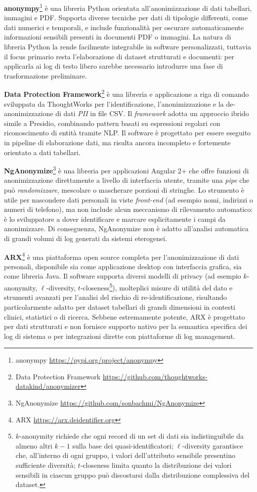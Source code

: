 \documentclass[12pt,twoside]{report}
\begin{document}
\textbf{anonympy}\footnote{anonympy \url{https://pypi.org/project/anonympy}} è una libreria Python orientata all'anonimizzazione di dati tabellari, immagini e PDF. Supporta diverse tecniche per dati di tipologie differenti, come dati numerici e temporali, e include funzionalità per oscurare automaticamente informazioni sensibili presenti in documenti PDF o immagini. La natura di libreria Python la rende facilmente integrabile in software personalizzati, tuttavia il focus primario resta l'elaborazione di dataset strutturati e documenti: per applicarla ai log di testo libero sarebbe necessario introdurre una fase di trasformazione preliminare.

\textbf{Data Protection Framework}\footnote{Data Protection Framework \url{https://github.com/thoughtworks-datakind/anonymizer}} è una libreria e applicazione a riga di comando sviluppata da ThoughtWorks per l'identificazione, l'anonimizzazione e la de-anonimizzazione di dati \textit{PII} in file CSV. Il \textit{framework} adotta un approccio ibrido simile a Presidio, combinando pattern basati su espressioni regolari con riconoscimento di entità tramite NLP. Il software è progettato per essere eseguito in pipeline di elaborazione dati, ma risulta ancora incompleto e fortemente orientato a dati tabellari.

\textbf{NgAnonymize}\footnote{NgAnonymize \url{https://github.com/sonbachmi/NgAnonymize}} è una libreria per applicazioni Angular 2+ che offre funzioni di anonimizzazione direttamente a livello di interfaccia utente, tramite una \textit{pipe} che può \textit{randomizzare}, mescolare o mascherare porzioni di stringhe. Lo strumento è utile per nascondere dati personali in viste \textit{front-end} (ad esempio nomi, indirizzi o numeri di telefono), ma non include alcun meccanismo di rilevamento automatico: è lo sviluppatore a dover identificare e marcare esplicitamente i campi da anonimizzare. Di conseguenza, NgAnonymize non è adatto all'analisi automatica di grandi volumi di log generati da sistemi eterogenei.

\textbf{ARX}\footnote{ARX \url{https://arx.deidentifier.org}} è una piattaforma open source completa per l'anonimizzazione di dati personali, disponibile sia come applicazione desktop con interfaccia grafica, sia come libreria Java. Il software supporta diversi modelli di privacy (ad esempio $k$-anonymity, $\ell$-diversity, $t$-closeness\footnote{$k$-anonymity richiede che ogni record di un set di dati sia indistinguibile da almeno altri $k-1$ sulla base dei quasi-identificatori; $\ell$-diversity garantisce che, all'interno di ogni gruppo, i valori dell'attributo sensibile presentino sufficiente diversità; $t$-closeness limita quanto la distribuzione dei valori sensibili in ciascun gruppo può discostarsi dalla distribuzione complessiva del dataset.}), molteplici misure di utilità del dato e strumenti avanzati per l'analisi del rischio di re-identificazione, risultando particolarmente adatto per dataset tabellari di grandi dimensioni in contesti clinici, statistici o di ricerca. Sebbene estremamente potente, ARX è progettato per dati strutturati e non fornisce supporto nativo per la semantica specifica dei log di sistema o per integrazioni dirette con piattaforme di log management.
\end{document}
